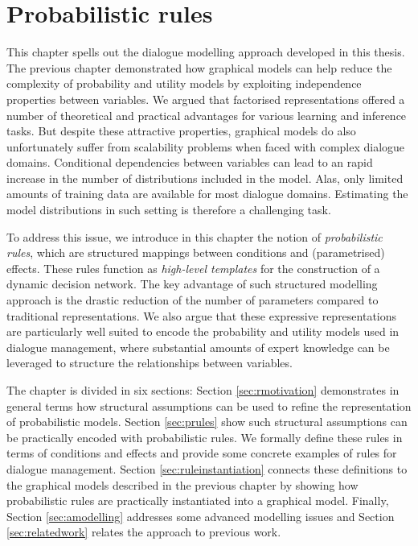 \chapter{Probabilistic rules}
\label{chap:rules}

This chapter spells out the dialogue modelling approach developed in this thesis.  The previous chapter demonstrated how graphical models can help reduce the complexity of probability and utility models by exploiting independence properties between variables. We argued that factorised representations offered a number of theoretical and practical advantages for various learning and inference tasks. But despite these attractive properties, graphical models do also unfortunately suffer from scalability problems when faced with complex dialogue domains.  Conditional dependencies between variables can lead to an rapid increase in the number of distributions included in the model. Alas, only limited amounts of training data are available for most dialogue domains.  Estimating the model distributions in such setting is therefore a challenging task. 

To address this issue, we introduce in this chapter the notion of \textit{probabilistic rules}, which are structured mappings between conditions and  (parametrised) effects.  These rules function as \textit{high-level templates} for the construction of a dynamic decision network.  The key advantage of such structured modelling approach is the drastic reduction of the number of parameters compared to traditional representations.  We also argue that these expressive representations are particularly well suited to encode the probability and utility models used in dialogue management, where substantial amounts of expert knowledge can be leveraged to structure the relationships between variables. 

The chapter is divided in six sections:  Section \ref{sec:rmotivation} demonstrates in general terms how structural assumptions can be used to refine the representation of probabilistic models. Section \ref{sec:prules} show such structural assumptions can be practically encoded with probabilistic rules.  We formally define these rules in terms of conditions and effects and provide some concrete examples of rules for dialogue management.  Section \ref{sec:ruleinstantiation} connects these definitions to the graphical models described in the previous chapter by showing how probabilistic rules are practically instantiated into a graphical model.  Finally, Section \ref{sec:amodelling} addresses some advanced modelling issues and Section \ref{sec:relatedwork} relates the approach to previous work.


